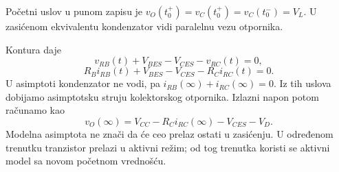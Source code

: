 Početni uslov u punom zapisu je $v_O(t_0^+)=v_C(t_0^+)=v_C(t_0^-)=V_L$. U zasićenom ekvivalentu kondenzator vidi paralelnu vezu otpornika.

Kontura daje
\[v_{RB}(t)+V_{BES}-V_{CES}-v_{RC}(t)=0,\]
\[R_Bi_{RB}(t)+V_{BES}-V_{CES}-R_Ci_{RC}(t)=0.\]
U asimptoti kondenzator ne vodi, pa $i_{RB}(\infty)+i_{RC}(\infty)=0$. Iz tih uslova dobijamo asimptotsku struju kolektorskog otpornika. Izlazni napon potom računamo kao
\[v_O(\infty)=V_{CC}-R_Ci_{RC}(\infty)-V_{CES}-V_D.\]
Modelna asimptota ne znači da će ceo prelaz ostati u zasićenju. U određenom trenutku tranzistor prelazi u aktivni režim; od tog trenutka koristi se aktivni model sa novom početnom vrednošću.
